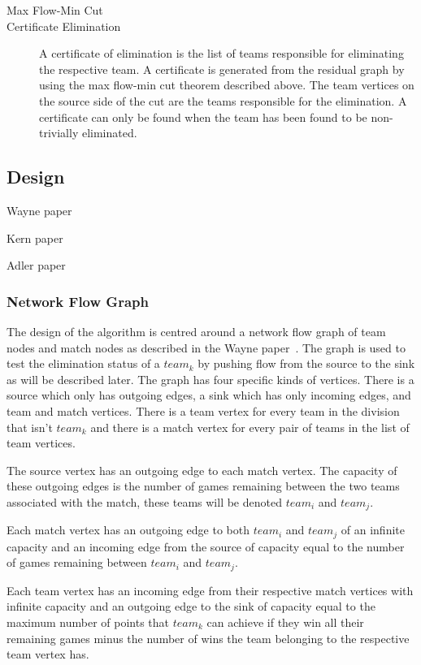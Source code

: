 \begin{description}
\item[Max Flow-Min Cut]

\item[Certificate Elimination] A certificate of elimination is the list of
teams responsible for eliminating the respective team. A certificate is
generated from the residual graph by using the max flow-min cut theorem
described above. The team vertices on the source side of the cut are the
teams responsible for the elimination. A certificate can only be found when
the team has been found to be non-trivially eliminated.

\end{description}

\subsection{Design}

Wayne paper~\cite{Wayne}

Kern paper~\cite{Kern}

Adler paper~\cite{Adler}

\subsubsection{Network Flow Graph}

The design of the algorithm is centred around a network flow graph of
team nodes and match nodes as described in the Wayne
paper~\cite{Wayne}. The graph is used to test the elimination status of a
$team_k$ by pushing flow from the source to the sink as will be described 
later. The graph has four specific kinds of vertices. There is a source
which only has outgoing edges, a sink which has only incoming edges, and
team and match vertices. There is a team vertex for every team in the
division that isn't $team_k$ and there is a match vertex for every pair
of teams in the list of team vertices.

The source vertex has an outgoing edge to each match vertex.
The capacity of these outgoing edges is the number of games remaining between
the two teams associated with the match, these teams will be denoted
$team_i$ and $team_j$.

Each match vertex has an outgoing edge to both $team_i$ and $team_j$ of an 
infinite capacity and an incoming edge from the source of capacity equal to the 
number of games remaining between $team_i$ and $team_j$.

Each team vertex has an incoming edge from their respective match vertices with
infinite capacity and an outgoing edge to the sink of capacity equal to the 
maximum number of points that $team_k$ can achieve if they win all their 
remaining games minus the number of wins the team belonging to the respective 
team vertex has. 

